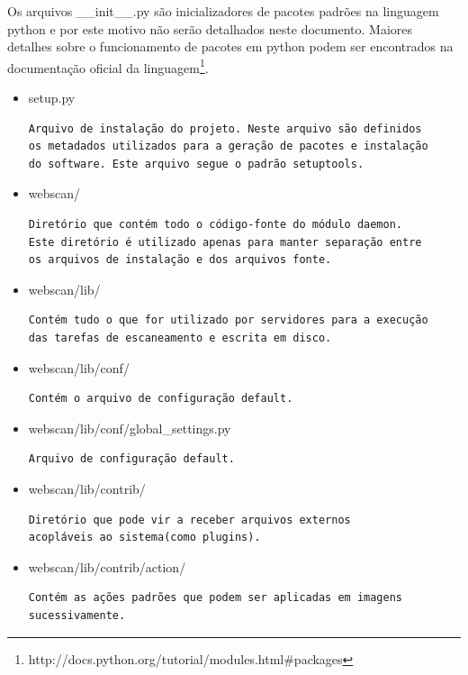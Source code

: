 Os arquivos \_\_init\_\_.py são inicializadores de pacotes padrões na linguagem 
python e por este motivo não serão detalhados neste documento. Maiores detalhes
sobre o funcionamento de pacotes em python podem ser encontrados na documentação
oficial da 
linguagem\footnote{http://docs.python.org/tutorial/modules.html\#packages}.

\begin{itemize}
\item setup.py
\begin{verbatim}
Arquivo de instalação do projeto. Neste arquivo são definidos
os metadados utilizados para a geração de pacotes e instalação
do software. Este arquivo segue o padrão setuptools.
\end{verbatim}

\item webscan/
\begin{verbatim}
Diretório que contém todo o código-fonte do módulo daemon.
Este diretório é utilizado apenas para manter separação entre
os arquivos de instalação e dos arquivos fonte.  
\end{verbatim}

\item webscan/lib/
\begin{verbatim}
Contém tudo o que for utilizado por servidores para a execução
das tarefas de escaneamento e escrita em disco.
\end{verbatim}

\item webscan/lib/conf/
\begin{verbatim}
Contém o arquivo de configuração default.
\end{verbatim}

\item webscan/lib/conf/global\_settings.py
\begin{verbatim}
Arquivo de configuração default.
\end{verbatim}

\item webscan/lib/contrib/
\begin{verbatim}
Diretório que pode vir a receber arquivos externos
acopláveis ao sistema(como plugins).
\end{verbatim}

\item webscan/lib/contrib/action/
\begin{verbatim}
Contém as ações padrões que podem ser aplicadas em imagens 
sucessivamente.
\end{verbatim}


\end{itemize}
